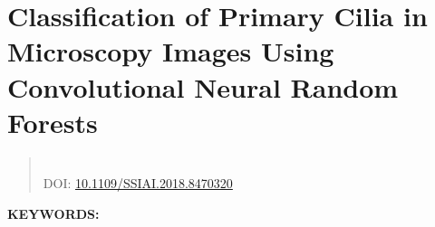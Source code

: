 \renewcommand{\figurepath}[1]{Chapters/cilia/figures/#1}

\chapter{Classification of Primary Cilia in Microscopy Images Using Convolutional Neural Random Forests}\label{ch:cilia}

\begin{quotation}
	\centering
	 \\
	DOI\@: \href{https://ieeexplore.ieee.org/abstract/document/8470320}{10.1109/SSIAI.2018.8470320}
\end{quotation}


%

\textbf{KEYWORDS:\ } %

\newpage



